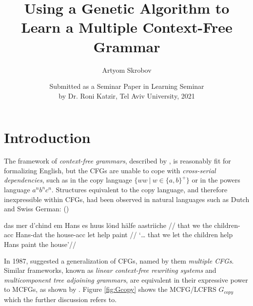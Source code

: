 \documentclass{article}
\title{Using a Genetic Algorithm to Learn a Multiple Context-Free Grammar}
\author{Artyom Skrobov}
\date{Submitted as a Seminar Paper in Learning Seminar\\ by Dr. Roni Katzir, Tel Aviv University, 2021}
\begin{document}
\maketitle

\section{Introduction}

The framework of \emph{context-free grammars}, described by \cite{chomsky1956},
is reasonably fit for formalizing English, but the CFGs are
unable to cope with \emph{cross-serial dependencies}, such as in the copy language
$\{ww\ |\ w\in\{a,b\}^+\}$ or in the powers language $a^n b^n c^n$.
Structures equivalent to the copy language, and therefore inexpressible within CFGs,
had been observed in natural languages such as Dutch and Swiss German: (\cite{shieber})

\exdisplay\begingl
\gla \nogloss{\ldots} das mer d'chind {em Hans} {es huus} lönd hälfe aastriiche //
\glb that we {the children}-{\sc acc} Hans-{\sc dat} {the house}-{\sc acc} let help paint //
\glft `{\ldots} that we let the children help Hans paint the house'//
\endgl\xe

In 1987, \cite{kasami} suggested a generalization of CFGs, named by them \emph{multiple CFGs}.
Similar frameworks, known as
\emph{linear context-free rewriting systems} and \emph{multicomponent tree adjoining grammars},
are equivalent in their expressive power to MCFGs, as shown by \cite{vijay}.
Figure \ref{fig:Gcopy} shows the MCFG/LCFRS $G_{copy}$ which the further discussion refers to.
\end{document}
